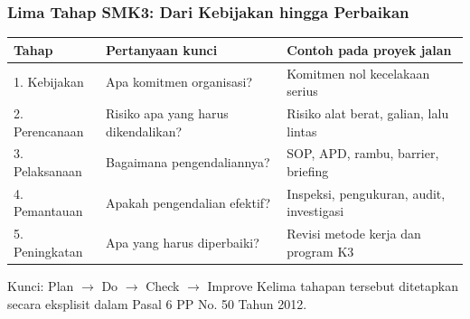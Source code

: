 \documentclass[../main.tex]{subfiles}
\begin{document}
\begin{frame}[mytitle=standard,t,mycolor=white]
	\frametitle{Lima Tahap SMK3: Dari Kebijakan hingga Perbaikan}

	\begin{table}
		\centering\small
		\begin{tabularx}{\textwidth}{|l|X|X|}
			\hline
			\textbf{Tahap} & \textbf{Pertanyaan kunci}           & \textbf{Contoh pada proyek jalan}        \\
			\hline
			1. Kebijakan   & Apa komitmen organisasi?            & Komitmen nol kecelakaan serius           \\
			\hline
			2. Perencanaan & Risiko apa yang harus dikendalikan? & Risiko alat berat, galian, lalu lintas   \\
			\hline
			3. Pelaksanaan & Bagaimana pengendaliannya?          & SOP, APD, rambu, barrier, briefing       \\
			\hline
			4. Pemantauan  & Apakah pengendalian efektif?        & Inspeksi, pengukuran, audit, investigasi \\
			\hline
			5. Peningkatan & Apa yang harus diperbaiki?          & Revisi metode kerja dan program K3       \\
			\hline
		\end{tabularx}
	\end{table}

	\begin{block}{Kunci: Plan $\rightarrow$ Do $\rightarrow$ Check $\rightarrow$ Improve}
		Kelima tahapan tersebut ditetapkan secara eksplisit dalam Pasal 6 PP No. 50 Tahun 2012.
	\end{block}
\end{frame}
\end{document}
